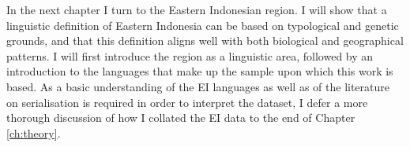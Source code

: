 In the next chapter I turn to the Eastern Indonesian region. I will show that a linguistic definition of Eastern Indonesia can be based on typological and genetic grounds, and that this definition aligns well with both biological and geographical patterns. I will first introduce the region as a linguistic area, followed by an introduction to the languages that make up the sample upon which this work is based. As a basic understanding of the EI languages as well as of the literature on serialisation is required in order to interpret the dataset, I defer a more thorough discussion of how I collated the EI data to the end of Chapter \ref{ch:theory}.